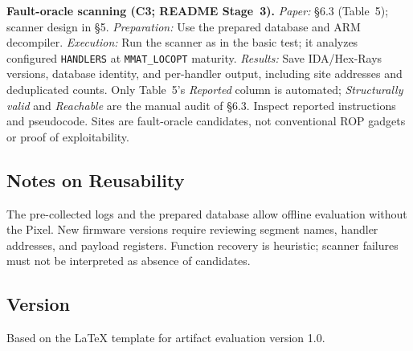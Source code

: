 \documentclass[nonacm,sigconf]{acmart}
\begin{document}
\begin{compactitem}
\item[(E3)] \textbf{Fault-oracle scanning (C3; README Stage~3).}
\emph{Paper:} \S6.3 (Table~5); scanner design in \S5.
\emph{Preparation:} Use the prepared database and ARM decompiler.
\emph{Execution:} Run the scanner as in the basic test; it analyzes
configured \texttt{HANDLERS} at \texttt{MMAT\_LOCOPT} maturity.
\emph{Results:} Save IDA/Hex-Rays versions, database identity, and
per-handler output, including site addresses and deduplicated counts.
Only Table~5's \emph{Reported} column is automated; \emph{Structurally
valid} and \emph{Reachable} are the manual audit of \S6.3.
Inspect reported instructions and pseudocode. Sites are fault-oracle
candidates, not conventional ROP gadgets or proof of exploitability.
\end{compactitem}

\subsection{Notes on Reusability}
The pre-collected logs and the prepared database allow offline evaluation
without the Pixel. New firmware versions require reviewing segment names,
handler addresses, and payload registers. Function recovery is heuristic;
scanner failures must not be interpreted as absence of candidates.

\subsection{Version}
Based on the LaTeX template for artifact evaluation version 1.0.




\end{document}
